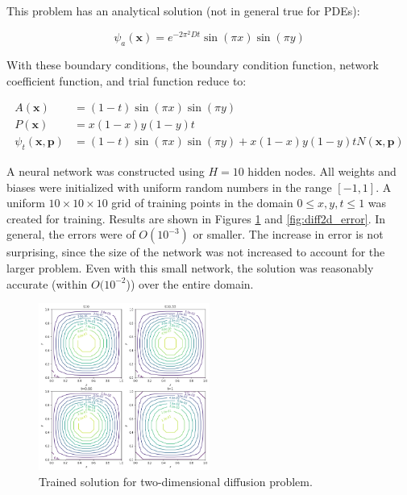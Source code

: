 \documentclass{article}
\begin{document}
This problem has an analytical solution (not in general true for PDEs):

\begin{equation}
  \psi_a(\mathbf x) = e^{-2\pi^2 D t} \sin(\pi x) \sin(\pi y)
\end{equation}

With these boundary conditions, the boundary condition function, network coefficient function, and trial function reduce to:

\begin{equation}
\begin{split}
  A(\mathbf x) &= (1 - t)\sin(\pi x) \sin(\pi y) \\
  P(\mathbf x) &= x(1 - x)y(1 - y)t \\
  \psi_t(\mathbf x,\mathbf p) &= (1 - t)\sin(\pi x) \sin(\pi y) + x(1 - x)y(1 - y)t N(\mathbf x,\mathbf p)
\end{split}
\end{equation}

A neural network was constructed using $H=10$ hidden nodes. All weights and biases were initialized with uniform random numbers in the range $[-1,1]$. A uniform $10\times10\times10$ grid of training points in the domain $0 \leq x,y,t \leq 1$ was created for training. Results are shown in Figures \ref{fig:diff2d_trained} and \ref{fig:diff2d_error}. In general, the errors were of $O(10^{-3})$ or smaller. The increase in error is not surprising, since the size of the network was not increased to account for the larger problem. Even with this small network, the solution was reasonably accurate (within $O(10^{-2}$)) over the entire domain.

\begin{figure}
\centering
\includegraphics[width=0.5\textwidth]{figures/diff2d_trained.png}
\caption{Trained solution for two-dimensional diffusion problem.}
\label{fig:diff2d_trained}
\end{figure}
\end{document}

